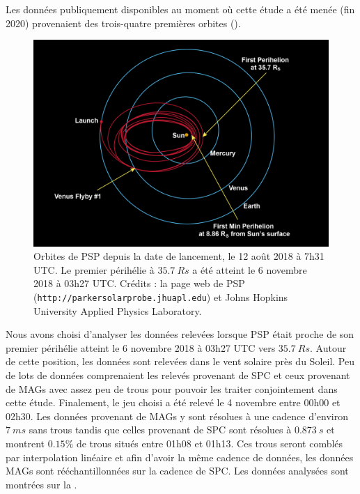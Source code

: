 Les données publiquement disponibles au moment où cette étude a été menée (fin 2020) provenaient des trois-quatre premières orbites (). 
\begin{figure}[!ht]
 \centering
\includegraphics[width=0.9\linewidth,trim=0cm 0cm 0cm 0cm, clip=false]{./Part_1/images/16-00815_MissionDesign}
\cprotect\caption{Orbites de \ac{PSP} depuis la date de lancement, le 12 août 2018 à 7h31 UTC. Le premier périhélie à $\SI{35.7}{Rs}$ a été atteint le 6 novembre 2018 à 03h27 UTC. Crédits : la page web de \ac{PSP} (\verb|http://parkersolarprobe.jhuapl.edu|) et Johns Hopkins University Applied Physics Laboratory.}
\label{fig:orbit_PSP}
\end{figure}
Nous avons choisi d'analyser les données relevées lorsque \ac{PSP} était proche de son premier périhélie atteint le 6 novembre 2018 à 03h27 \acs{UTC} vers $\SI{35.7}{Rs}$. Autour de cette position, les données sont relevées dans le vent solaire près du Soleil. Peu de lots de données comprenaient les relevés provenant de \acs{SPC} et ceux provenant de \acs{MAGs} avec assez peu de trous pour pouvoir les traiter conjointement dans cette étude. Finalement, le jeu choisi a été relevé le 4 novembre entre 00h00 et 02h30. Les données provenant de \acs{MAGs} y sont résolues à une cadence d'environ $\SI{7}{ms}$ sans trous tandis que celles provenant de \acs{SPC} sont résolues à $\SI{0,873}{s}$ et montrent $0.15\%$ de trous situés entre 01h08 et 01h13. Ces trous seront comblés par interpolation linéaire et afin d'avoir la même cadence de données, les données \acs{MAGs} sont rééchantillonnées sur la cadence de \acs{SPC}. Les données analysées sont montrées sur la .  
